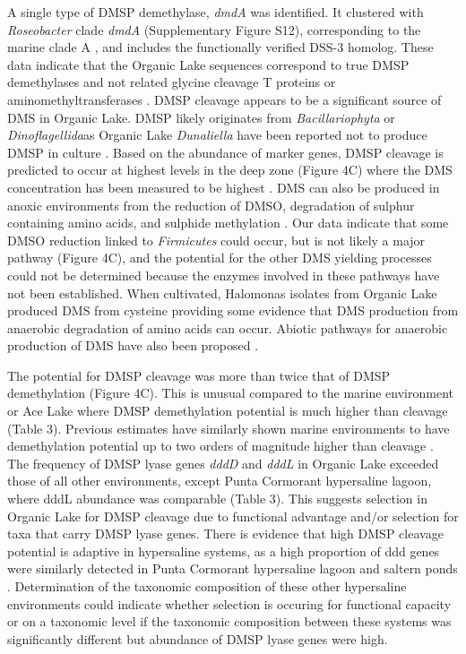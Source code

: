 A single type of \ac{DMSP} demethylase, \emph{dmdA} was identified. 
It clustered with \emph{Roseobacter} clade \emph{dmdA} (Supplementary Figure S12), corresponding to the marine clade A \cite{Howard2006}, and includes the functionally verified \cite{R. pomeroyi} DSS-3 homolog. 
These data indicate that the Organic Lake sequences correspond to true \ac{DMSP} demethylases and not related glycine cleavage T proteins or aminomethyltransferases \cite{Howard2006}. 
\ac{DMSP} cleavage appears to be a significant source of \ac{DMS} in Organic Lake. 
\ac{DMSP} likely originates from \emph{Bacillariophyta} or \emph{Dinoflagellida}as Organic Lake \emph{Dunaliella} have been reported not to produce \ac{DMSP} in culture \cite{Franzmann1987b}. 
Based on the abundance of marker genes, \ac{DMSP} cleavage is predicted to occur at highest levels in the deep zone (Figure 4C) where the \ac{DMS} concentration has been measured to be highest \cite{Deprez1986, Franzmann1987b, Gibson1991, Roberts1993a, Roberts1993b}. 
\ac{DMS} can also be produced in anoxic environments from the reduction of \ac{DMSO}, degradation of sulphur containing amino acids, and sulphide methylation \cite{Schafer2010}. 
Our data indicate that some \ac{DMSO} reduction linked to \emph{Firmicutes} could occur, but is not likely a major pathway (Figure 4C), and the potential for the other \ac{DMS} yielding processes could not be determined because the enzymes involved in these pathways have not been established. 
When cultivated, Halomonas isolates from Organic Lake produced \ac{DMS} from cysteine \cite{Franzmann1987b} providing some evidence that \ac{DMS} production from anaerobic degradation of amino acids can occur. 
Abiotic pathways for anaerobic production of \ac{DMS} have also been proposed \cite{Roberts1993b}.

The potential for \ac{DMSP} cleavage was more than twice that of \ac{DMSP} demethylation (Figure 4C). 
This is unusual compared to the marine environment or Ace Lake where \ac{DMSP} demethylation potential is much higher than cleavage (Table 3). 
Previous estimates have similarly shown marine environments to have demethylation potential up to two orders of magnitude higher than cleavage \cite{Howard2008, Todd2009, Todd2011b, Reisch2011b}. 
The frequency of \ac{DMSP} lyase genes \emph{dddD} and \emph{dddL} in Organic Lake exceeded those of all other environments, except Punta Cormorant hypersaline lagoon, where dddL abundance was comparable (Table 3). 
This suggests selection in Organic Lake for \ac{DMSP} cleavage due to functional advantage and/or selection for taxa that carry \ac{DMSP} lyase genes. 
There is evidence that high \ac{DMSP} cleavage potential is adaptive in hypersaline systems, as a high proportion of ddd genes were similarly detected in Punta Cormorant hypersaline lagoon and saltern ponds \cite{Raina2010}. Determination of the taxonomic composition of these other hypersaline environments could indicate whether selection is occuring for functional capacity or on a taxonomic level if the taxonomic composition between these systems was significantly different but abundance of DMSP lyase genes were high.

